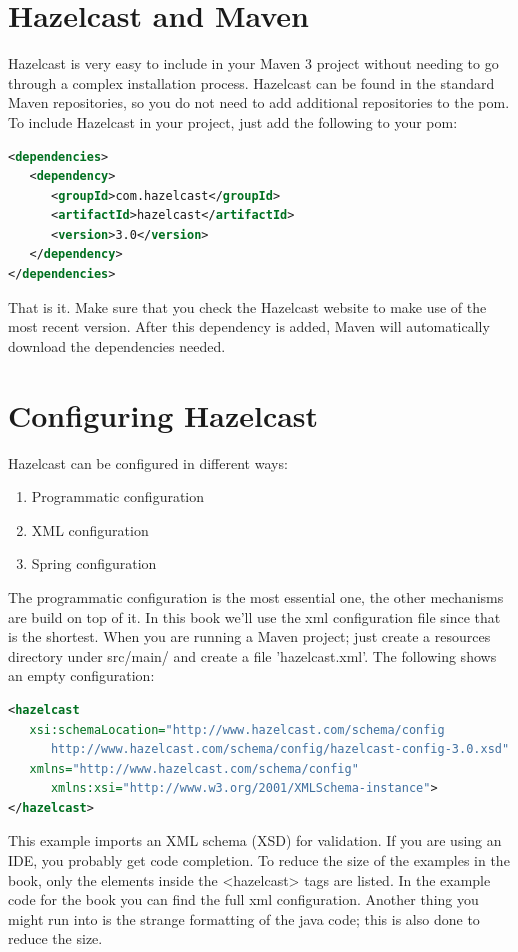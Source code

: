 \section{Hazelcast and Maven}
Hazelcast is very easy to include in your Maven 3 project without needing to go through a complex installation process. Hazelcast can be found in the standard Maven repositories, so you do not need to add additional repositories to the pom. To include Hazelcast in your project, just add the following to your pom:
\begin{lstlisting}[language=xml]
<dependencies>	
   <dependency>
      <groupId>com.hazelcast</groupId>
      <artifactId>hazelcast</artifactId>
      <version>3.0</version>
   </dependency>
</dependencies>
\end{lstlisting}
That is it. Make sure that you check the Hazelcast website to make use of the most recent version. After this dependency is added, Maven will automatically download the dependencies needed.

\section{Configuring Hazelcast}
Hazelcast can be configured in different ways:
\begin{enumerate}
\item Programmatic configuration
\item XML configuration 
\item Spring configuration
\end{enumerate}
The programmatic configuration is the most essential one, the other mechanisms are build on top of it. In this book we'll use the xml configuration file since that is the shortest. When you are running a Maven project; just create a resources directory under src/main/ and create a file 'hazelcast.xml'. The following shows an empty configuration:
\begin{lstlisting}[language=xml]
<hazelcast 
   xsi:schemaLocation="http://www.hazelcast.com/schema/config                               
      http://www.hazelcast.com/schema/config/hazelcast-config-3.0.xsd"
   xmlns="http://www.hazelcast.com/schema/config"
      xmlns:xsi="http://www.w3.org/2001/XMLSchema-instance">
</hazelcast>
\end{lstlisting}
This example imports an XML schema (XSD) for validation. If you are using an IDE, you probably get code completion. To reduce the size of the examples in the book, only the elements inside the <hazelcast> tags are listed. In the example code for the book you can find the full xml configuration. Another thing you might run into is the strange formatting of the java code; this is also done to reduce the size. 

